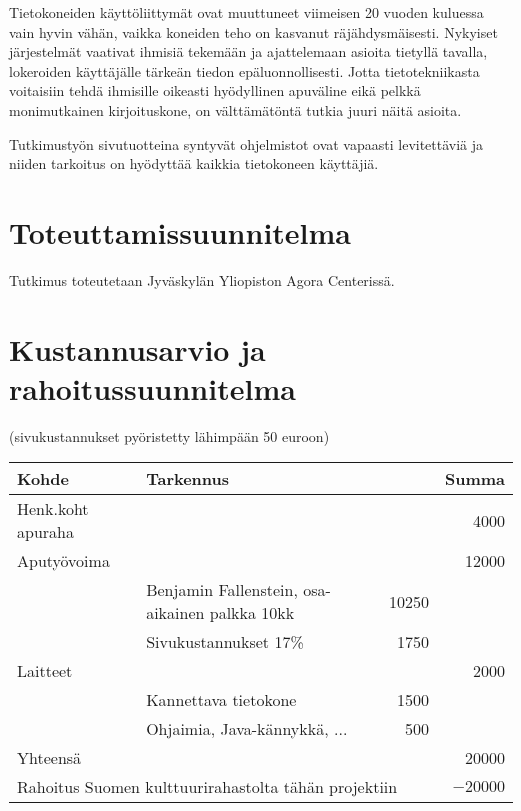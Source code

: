 \documentclass{article}
\begin{document}
Tietokoneiden käyttöliittymät ovat muuttuneet viimeisen 20 vuoden ku\-lu\-es\-sa
vain hyvin vähän, vaikka koneiden teho on kasvanut rä\-jäh\-dys\-mäi\-ses\-ti.
Nykyiset järjestelmät vaativat ihmisiä tekemään ja ajattelemaan asioita
tietyllä tavalla, lokeroiden käyttäjälle tärkeän tiedon epäluonnollisesti.
Jotta tietotekniikasta voitaisiin tehdä ihmisille oikeasti hyödyllinen
apuväline eikä pelkkä monimutkainen kirjoituskone, on välttämätöntä tutkia juuri näitä asioita.

Tutkimustyön sivutuotteina syntyvät ohjelmistot ovat vapaasti levitettäviä
ja niiden tarkoitus on hyödyttää kaikkia tietokoneen käyttäjiä.


\section{Toteuttamissuunnitelma}

Tutkimus toteutetaan Jyväskylän Yliopiston Agora Centerissä.


\section{Kustannusarvio ja rahoitussuunnitelma}

(sivukustannukset pyöristetty lähimpään 50 euroon)

\begin{tabular}{l|l|r|r}
Kohde & Tarkennus &  & Summa\\
\hline
Henk.koht apuraha & & & 4000 \\
Aputyövoima & & & 12000 \\
& Benjamin Fallenstein, osa-aikainen palkka 10kk & 10250 \\
& Sivukustannukset 17\%        & 1750 \\
Laitteet                & & & 2000 \\
& Kannettava tietokone & 1500 \\
& Ohjaimia, Java-kännykkä, ... & 500 & \\
\hline
Yhteensä & & & 20000 \\
\hline
\multicolumn{3}{l}{Rahoitus Suomen kulttuurirahastolta tähän projektiin}
    & $-20000$ \\
\end{tabular}





\end{document}
